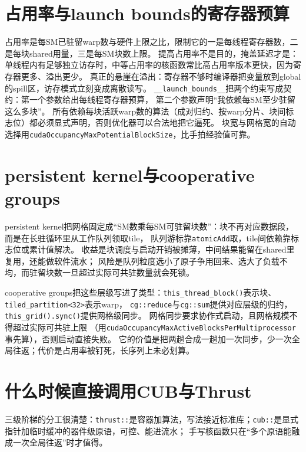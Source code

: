 \documentclass[12pt,a4paper,fontset=fandol]{ctexbook}
\newcommand{\Tp}[1]{\texttt{#1}}
\newcommand{\Bk}{\allowbreak}
\begin{document}
\section{占用率与launch bounds的寄存器预算}

占用率是每SM已驻留warp数与硬件上限之比，限制它的一是每线程寄存器数，二是每块shared用量，三是每SM块数上限。
提高占用率不是目的，掩盖延迟才是：单线程内有足够独立访存时，中等占用率的核函数常比高占用率版本更快，因为寄存器更多、溢出更少。
真正的悬崖在溢出：寄存器不够时编译器把变量放到global的spill区，访存模式立刻变成离散读写。
\Tp{\_\_launch\_bounds\_\_}把两个约束写成契约：第一个参数给出每线程寄存器预算，
第二个参数声明``我依赖每SM至少驻留这么多块''。
所有依赖每块活跃warp数的算法（成对归约、按warp分片、块间标志位）都必须显式声明，否则优化器可以合法地把它逼死。
块宽与网格宽的自动选择用\Tp{cudaOccupancyMaxPotentialBlockSize}，比手拍经验值可靠。

\section{persistent kernel与cooperative groups}

persistent kernel把网格固定成``SM数乘每SM可驻留块数''：块不再对应数据段，而是在长驻循环里从工作队列领取tile，
队列游标靠\Tp{atomicAdd}取，tile间依赖靠标志位或累计值解决。
收益是块调度与启动开销被摊薄，中间结果能留在shared里复用，还能做软件流水；
风险是队列粒度选小了原子争用回来、选大了负载不均，而驻留块数一旦超过实际可共驻数量就会死锁。

cooperative groups把这些层级写进了类型：\Tp{this\_{\Bk}thread\_{\Bk}block()}表示块、\Tp{tiled\_{\Bk}partition<32>}表示warp，
\Tp{cg::reduce}与\Tp{cg::sum}提供对应层级的归约，\Tp{this\_{\Bk}grid().sync()}提供网格级同步。
网格同步要求协作式启动，且网格规模不得超过实际可共驻上限
（用\Tp{cuda{\Bk}Occupancy{\Bk}Max{\Bk}Active{\Bk}Blocks{\Bk}Per{\Bk}Multiprocessor}事先算），否则启动直接失败。
它的价值是把两趟合成一趟加一次同步，少一次全局往返；代价是占用率被钉死，长序列上未必划算。

\section{什么时候直接调用CUB与Thrust}

三级阶梯的分工很清楚：\Tp{thrust::}是容器加算法，写法接近标准库；\Tp{cub::}是显式指针加临时缓冲的器件级原语，可控、能进流水；
手写核函数只在``多个原语能融成一次全局往返''时才值得。
\end{document}
